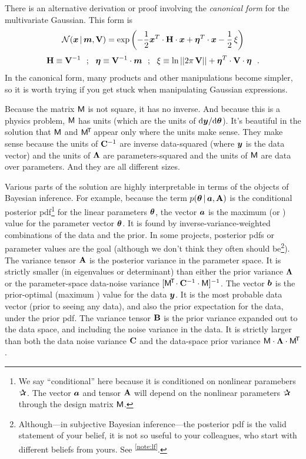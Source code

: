 There is an alternative derivation or proof involving the
\textsl{canonical form} for the multivariate Gaussian. This form is
\begin{equation}
\mathcal{N}\!\,(\boldsymbol{x}\,|\,\boldsymbol{m},\mathbf{V}) = \exp\left(-\frac{1}{2}\boldsymbol{x}^T \cdot\mathbf{H} \cdot \boldsymbol{x} + \boldsymbol{\eta}^T \cdot \boldsymbol{x} - \frac{1}{2}\,\xi\right)
\end{equation}
\begin{equation}
\mathbf{H}\equiv\mathbf{V}^{-1} ~~;~~
\boldsymbol{\eta}\equiv\mathbf{V}^{-1}\cdot\boldsymbol{m} ~~;~~
\xi\equiv\ln||2\pi\,\mathbf{V}||+\boldsymbol{\eta}^T\cdot\mathbf{V}\cdot\boldsymbol{\eta} ~~.
\end{equation}
In the canonical form, many products and other manipulations become
simpler, so it is worth trying if you get stuck when manipulating Gaussian expressions.

Because the matrix $\mathsf{M}$ is not square, it has no inverse. And because this
is a physics problem, $\mathsf{M}$ has units (which are the units of
$\mathrm{d}\boldsymbol{y}/\mathrm{d}\boldsymbol{\theta}$).
It's beautiful in the solution that $\mathsf{M}$ and $\mathsf{M}^{\!\mathsf{T}\!}$ appear only where the
units make sense.
They make sense because the units of $\mathbf{C}^{-1}$ are inverse data-squared (where $\boldsymbol{y}$
is the data vector) and the units of $\mathbf{\Lambda}$ are parameters-squared and the units
of $\mathsf{M}$ are data over parameters.
And they are all different sizes.

Various parts of the solution are highly interpretable in terms of the
objects of Bayesian inference. For example, because the term $p(\boldsymbol{\theta}\,|\,
\boldsymbol{a},\mathbf{A})$ is the conditional posterior pdf\footnote{We say ``conditional'' here
  because it is conditioned on nonlinear paramebers $\bP$.
  The vector $\boldsymbol{a}$ and tensor
  $\mathbf{A}$ will depend on the nonlinear parameters $\bP$ through the design matrix
  $\mathsf{M}$.} for the linear parameters $\boldsymbol{\theta}$, the vector $\boldsymbol{a}$ is the maximum
 (or ) value for the parameter vector
$\boldsymbol{\theta}$.
It is found by inverse-variance-weighted combinations of the data and the prior.
In some projects, posterior pdfs or  parameter values are the goal
(although we don't think they often should be\footnote{Although---in subjective
  Bayesian inference---the posterior pdf
  is the valid statement of your belief, it is not so useful to your colleagues,
  who start with different beliefs from yours. See \notename\textsuperscript{\ref{note:lf}}.}).
The variance tensor $\mathbf{A}$ is the posterior variance in the parameter space.
It is strictly smaller (in eigenvalues or determinant) than either
the prior variance $\mathbf{\Lambda}$ or the parameter-space data-noise
variance $[\mathsf{M}^{\!\mathsf{T}\!}\cdot\mathbf{C}^{-1}\cdot\mathsf{M}]^{-1}$.
The vector $\boldsymbol{b}$ is the prior-optimal (maximum )
value for the data $\boldsymbol{y}$.
It is the most probable data vector (prior to seeing any data),
and also the prior expectation for the data,
under the prior pdf.
The variance tensor $\mathbf{B}$ is the prior variance expanded out to the
data space, and including the noise variance in the data.
It is strictly larger than both the data noise variance $\mathbf{C}$ and the
data-space prior variance $\mathsf{M}\cdot\mathbf{\Lambda}\cdot\mathsf{M}^{\!\mathsf{T}\!}$.


